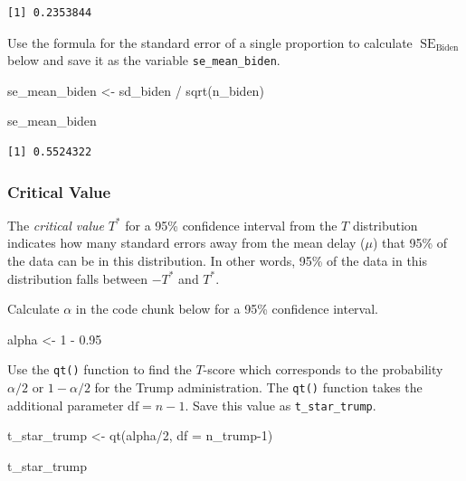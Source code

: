 \documentclass[
  letterpaper,
  DIV=11,
  numbers=noendperiod]{scrartcl}
\newenvironment{Shaded}{\begin{snugshade}}{\end{snugshade}}
\newcommand{\AttributeTok}[1]{\textcolor[rgb]{0.40,0.45,0.13}{#1}}
\newcommand{\DecValTok}[1]{\textcolor[rgb]{0.68,0.00,0.00}{#1}}
\newcommand{\FloatTok}[1]{\textcolor[rgb]{0.68,0.00,0.00}{#1}}
\newcommand{\FunctionTok}[1]{\textcolor[rgb]{0.28,0.35,0.67}{#1}}
\newcommand{\NormalTok}[1]{\textcolor[rgb]{0.00,0.23,0.31}{#1}}
\newcommand{\OtherTok}[1]{\textcolor[rgb]{0.00,0.23,0.31}{#1}}
\newcommand{\SpecialCharTok}[1]{\textcolor[rgb]{0.37,0.37,0.37}{#1}}
\begin{document}
\begin{verbatim}
[1] 0.2353844
\end{verbatim}

Use the formula for the standard error of a single proportion to
calculate \(\operatorname{SE}_{\text{Biden}}\) below and save it as the
variable \texttt{se\_mean\_biden}.

\begin{Shaded}
\begin{Highlighting}[]
\NormalTok{se\_mean\_biden }\OtherTok{\textless{}{-}}\NormalTok{ sd\_biden }\SpecialCharTok{/} \FunctionTok{sqrt}\NormalTok{(n\_biden)}

\NormalTok{se\_mean\_biden}
\end{Highlighting}
\end{Shaded}

\begin{verbatim}
[1] 0.5524322
\end{verbatim}

\subsubsection{Critical Value}\label{critical-value-1}

The \emph{critical value} \(T^*\) for a 95\% confidence interval from
the \(T\) distribution indicates how many standard errors away from the
mean delay (\(\mu\)) that 95\% of the data can be in this distribution.
In other words, 95\% of the data in this distribution falls between
\(-T^*\) and \(T^*\).

Calculate \(\alpha\) in the code chunk below for a 95\% confidence
interval.

\begin{Shaded}
\begin{Highlighting}[]
\NormalTok{alpha }\OtherTok{\textless{}{-}} \DecValTok{1} \SpecialCharTok{{-}} \FloatTok{0.95}
\end{Highlighting}
\end{Shaded}

Use the \texttt{qt()} function to find the \(T\)-score which corresponds
to the probability \(\alpha/2\) or \(1-\alpha/2\) for the Trump
administration. The \texttt{qt()} function takes the additional
parameter \(\text{df}=n-1\). Save this value as \texttt{t\_star\_trump}.

\begin{Shaded}
\begin{Highlighting}[]
\NormalTok{t\_star\_trump }\OtherTok{\textless{}{-}} \FunctionTok{qt}\NormalTok{(alpha}\SpecialCharTok{/}\DecValTok{2}\NormalTok{, }
                   \AttributeTok{df =}\NormalTok{ n\_trump}\DecValTok{{-}1}\NormalTok{)}

\NormalTok{t\_star\_trump}
\end{Highlighting}
\end{Shaded}
\end{document}
